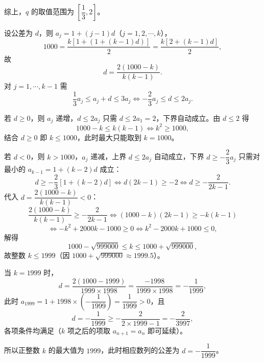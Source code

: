 \begin{answer}
综上，$q$ 的取值范围为 $\left[\dfrac13,2\right]$。


设公差为 $d$，则 $a_j=1+(j-1)d$（$j=1,2,\cdots,k$），
\nopagebreak[4]
\[1000=\frac{k\left[1+\left(1+(k-1)d\right)\right]}2=\frac{k\left[2+(k-1)d\right]}2,\]
故
\nopagebreak[4]
\[d=\frac{2(1000-k)}{k(k-1)} .\]
对 $j=1,\cdots,k-1$ 需
\nopagebreak[4]
\[\frac13a_j\leqslant a_j+d\leqslant3a_j\iff-\frac23a_j\leqslant d\leqslant2a_j .\]

若 $d\geqslant0$，则 $a_j$ 递增，$d\leqslant2a_j$ 只需 $d\leqslant2a_1=2$，下界自动成立。由 $d\leqslant2$ 得
\nopagebreak[4]
\[1000-k\leqslant k(k-1)\iff k^2\geqslant1000,\]
结合 $d\geqslant0$ 即 $k\leqslant1000$，此时最大只能取到 $k=1000$。

若 $d<0$，则 $k>1000$，$a_j$ 递减，上界 $d\leqslant2a_j$ 自动成立，下界 $d\geqslant-\dfrac23a_j$ 只需对最小的 $a_{k-1}=1+(k-2)d$ 成立：
\nopagebreak[4]
\[d\geqslant-\frac23\left[1+(k-2)d\right]\iff d(2k-1)\geqslant-2\iff d\geqslant-\frac2{2k-1} .\]
代入 $d=\dfrac{2(1000-k)}{k(k-1)}<0$：
\nopagebreak[4]
\[\frac{2(1000-k)}{k(k-1)}\geqslant-\frac2{2k-1}\iff(1000-k)(2k-1)\geqslant-k(k-1)\]
\nopagebreak[4]
\[\iff-k^2+2000k-1000\geqslant0\iff k^2-2000k+1000\leqslant0,\]
解得
\nopagebreak[4]
\[1000-\sqrt{999000}\leqslant k\leqslant1000+\sqrt{999000},\]
故整数 $k\leqslant1999$（因 $1000+\sqrt{999000}\approx1999.5$）。

当 $k=1999$ 时，
\nopagebreak[4]
\[d=\frac{2(1000-1999)}{1999\times1998}=\frac{-1998}{1999\times1998}=-\frac1{1999},\]
此时 $a_{1999}=1+1998\times\left(-\dfrac1{1999}\right)=\dfrac1{1999}>0$，且
\nopagebreak[4]
\[d=-\frac1{1999}\geqslant-\frac2{2\times1999-1}=-\frac2{3997},\]
各项条件均满足（$k$ 项之后的项取 $a_{n+1}=a_n$ 即可延续）。

所以正整数 $k$ 的最大值为 $1999$，此时相应数列的公差为 $d=-\dfrac1{1999}$。




\end{answer}